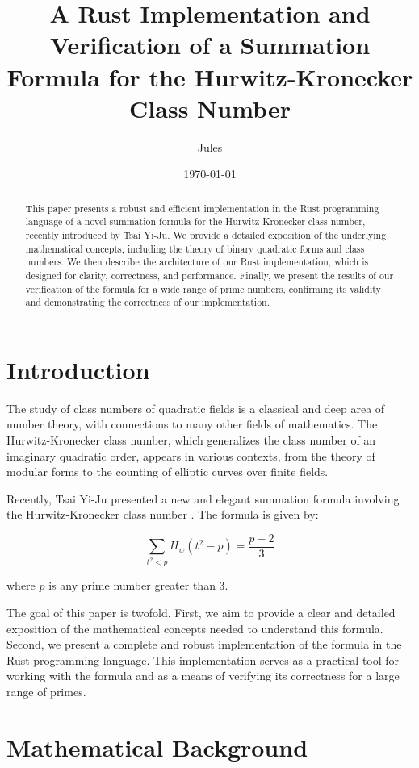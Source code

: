 \documentclass{article}
\title{A Rust Implementation and Verification of a Summation Formula for the Hurwitz-Kronecker Class Number}
\author{Jules}
\date{\today}
\begin{document}
\maketitle

\begin{abstract}
This paper presents a robust and efficient implementation in the Rust programming language of a novel summation formula for the Hurwitz-Kronecker class number, recently introduced by Tsai Yi-Ju. We provide a detailed exposition of the underlying mathematical concepts, including the theory of binary quadratic forms and class numbers. We then describe the architecture of our Rust implementation, which is designed for clarity, correctness, and performance. Finally, we present the results of our verification of the formula for a wide range of prime numbers, confirming its validity and demonstrating the correctness of our implementation.
\end{abstract}

\section{Introduction}

The study of class numbers of quadratic fields is a classical and deep area of number theory, with connections to many other fields of mathematics. The Hurwitz-Kronecker class number, which generalizes the class number of an imaginary quadratic order, appears in various contexts, from the theory of modular forms to the counting of elliptic curves over finite fields.

Recently, Tsai Yi-Ju presented a new and elegant summation formula involving the Hurwitz-Kronecker class number \cite{tsai2025montgomery}. The formula is given by:

\begin{equation}
\sum_{t^2 < p} H_w(t^2 - p) = \frac{p - 2}{3}
\end{equation}

where $p$ is any prime number greater than 3.

The goal of this paper is twofold. First, we aim to provide a clear and detailed exposition of the mathematical concepts needed to understand this formula. Second, we present a complete and robust implementation of the formula in the Rust programming language. This implementation serves as a practical tool for working with the formula and as a means of verifying its correctness for a large range of primes.

\section{Mathematical Background}
\end{document}
